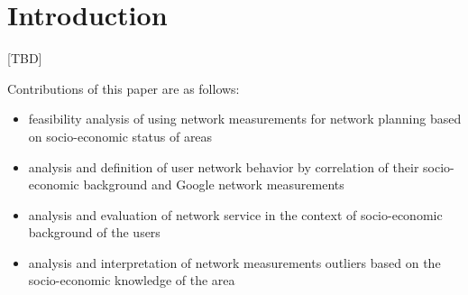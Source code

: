 \section{Introduction}

[TBD]

Contributions of this paper are as follows:
\begin{itemize}[noitemsep]
\item feasibility analysis of using network measurements for network planning based on socio-economic status of areas
\item analysis and definition of user network behavior by correlation of their socio-economic background and Google network measurements
\item analysis and evaluation of network service in the context of socio-economic background of the users
\item analysis and interpretation of network measurements outliers based on the socio-economic knowledge of the area
\end{itemize}